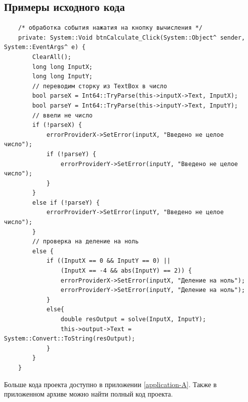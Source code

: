 \subsection{Примеры исходного кода}
\begin{verbatim}
	/* обработка события нажатия на кнопку вычисления */
	private: System::Void btnCalculate_Click(System::Object^ sender, System::EventArgs^ e) {
		ClearAll();
		long long InputX;
		long long InputY;
		// переводим сторку из TextBox в число
		bool parseX = Int64::TryParse(this->inputX->Text, InputX);
		bool parseY = Int64::TryParse(this->inputY->Text, InputY);
		// ввели не число
		if (!parseX) {
			errorProviderX->SetError(inputX, "Введено не целое число");
			if (!parseY) {
				errorProviderY->SetError(inputY, "Введено не целое число");
			}
		}
		else if (!parseY) {
			errorProviderY->SetError(inputY, "Введено не целое число");
		}
		// проверка на деление на ноль
		else {
			if ((InputX == 0 && InputY == 0) || 
				(InputX == -4 && abs(InputY) == 2)) {
				errorProviderX->SetError(inputX, "Деление на ноль");
				errorProviderY->SetError(inputY, "Деление на ноль");
			}
			else{
				double resOutput = solve(InputX, InputY);
				this->output->Text = System::Convert::ToString(resOutput);
			}
		}
	}
\end{verbatim}

Больше кода проекта доступно в приложении \ref{application-A}. Также в приложенном архиве можно найти полный код проекта.